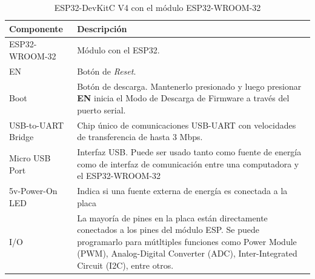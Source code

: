 \documentclass[../main]{subfiles}
\begin{document}
\begin{table}[H]
	\centering
	\begin{tabularx}{0.9\textwidth}{m{2.6cm} X}
		\toprule
		Componente         & Descripción                                                                                                                                                                                                                                    \\
		\midrule
		ESP32-WROOM-32     & Módulo con el ESP32.                                                                                                                                                                                                                           \\
		EN                 & Botón de \textit{Reset}.                                                                                                                                                                                                                       \\
		Boot               & Botón de descarga. Mantenerlo presionado y luego presionar \textbf{EN} inicia el Modo de Descarga de Firmware a través del puerto serial.                                                                                                      \\
		USB-to-UART Bridge & Chip único de comunicaciones USB-UART con velocidades de transferencia de hasta 3 Mbps.                                                                                                                                                        \\
		Micro USB Port     & Interfaz USB. Puede ser usado tanto como fuente de energía como de interfaz de comunicación entre una computadora y el ESP32-WROOM-32                                                                                                          \\
		5v-Power-On LED    & Indica si una fuente externa de energía es conectada a la placa                                                                                                                                                                                \\
		I/O                & La mayoría de pines en la placa están directamente conectados a los pines del módulo ESP. Se puede programarlo para mútltiples funciones como Power Module (PWM), Analog-Digital Converter (ADC), Inter-Integrated Circuit (I2C), entre otros. \\
		\bottomrule
	\end{tabularx}
	\caption{ESP32-DevKitC V4 con el módulo ESP32-WROOM-32 \cite{devkitv4}}
	\label{esp32devkitcv4_descrp}
\end{table}
\end{document}
